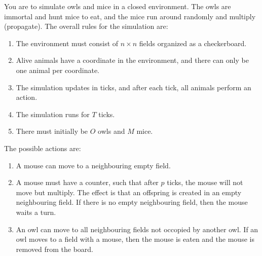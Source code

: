 You are to simulate owls and mice in a closed environment. The owls are immortal and hunt mice to eat, and the mice run around randomly and multiply (propagate). The overall rules for the simulation are:
\begin{enumerate}
\item The environment must consist of $n\times n$ fields organized as a checkerboard.
\item Alive animals have a coordinate in the environment, and there can only be one animal per coordinate.
\item The simulation updates in ticks, and after each tick, all animals perform an action.
\item The simulation runs for $T$ ticks.
\item There must initially be $O$ owls and $M$ mice.
\end{enumerate}
The possible actions are:
\begin{enumerate}[resume]
\item A mouse can move to a neighbouring empty field.
\item A mouse must have a counter, such that after $p$ ticks, the mouse will not move but multiply. The effect is that an offspring is created in an empty neighbouring field. If there is no empty neighbouring field, then the mouse waits a turn.
\item An owl can move to all neighbouring fields not occopied by another owl. If an owl moves to a field with a mouse, then the mouse is eaten and the mouse is removed from the board.
\end{enumerate}

